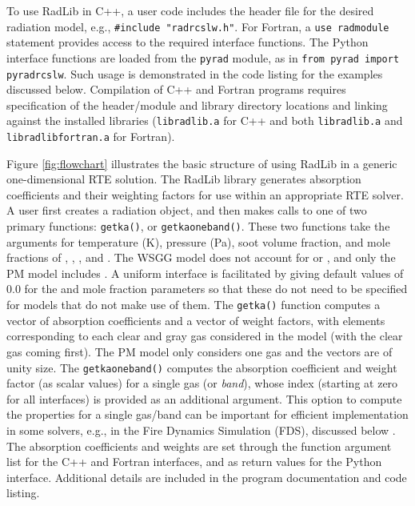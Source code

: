 \documentclass[preprint,12pt]{elsarticle}
\begin{document}
To use RadLib in C++, a user code includes the header file for the desired radiation model, e.g., \texttt{\#include "rad\textunderscore rcslw.h"}. For Fortran, a \texttt{use rad\textunderscore module} statement provides access to the required interface functions. The Python interface functions are loaded from the \texttt{pyrad} module, as in \texttt{from pyrad import pyrad\textunderscore rcslw}. Such usage is demonstrated in the code listing for the examples discussed below. Compilation of C++ and Fortran programs requires specification of the header/module and library directory locations and linking against the installed libraries (\texttt{libradlib.a} for C++ and both \texttt{libradlib.a} and \texttt{libradlib\textunderscore fortran.a} for Fortran).

Figure \ref{fig:flowchart} illustrates the basic structure of using RadLib in a generic one-dimensional RTE solution. The RadLib library generates absorption coefficients and their weighting factors for use within an appropriate RTE solver. A user first creates a radiation object, and then makes calls to one of two primary functions: \texttt{get\textunderscore k\textunderscore a()}, or \texttt{get\textunderscore k\textunderscore a\textunderscore oneband()}.
These two functions take the arguments for temperature (K), pressure (Pa), soot volume fraction, and mole fractions of , , , and . The WSGG model does not account for  or , and only the PM model includes . A uniform interface is facilitated by giving default values of 0.0 for the  and  mole fraction parameters so that these do not need to be specified for models that do not make use of them. The \texttt{get\textunderscore k\textunderscore a()} function computes a vector of absorption coefficients and a vector of weight factors, with elements corresponding to each clear and gray gas considered in the model (with the clear gas coming first). The PM model only considers one gas and the vectors are of unity size. The \texttt{get\textunderscore k\textunderscore a\textunderscore oneband()} computes the absorption coefficient and weight factor (as scalar values) for a single gas (or \emph{band}), whose index (starting at zero for all interfaces) is provided as an additional argument. This option to compute the properties for a single gas/band can be important for efficient implementation in some solvers, e.g., in the Fire Dynamics Simulation (FDS), discussed below \cite{FDS}. The absorption coefficients and weights are set through the function argument list for the C++ and Fortran interfaces, and as return values for the Python interface. Additional details are included in the program documentation and code listing.
\end{document}
